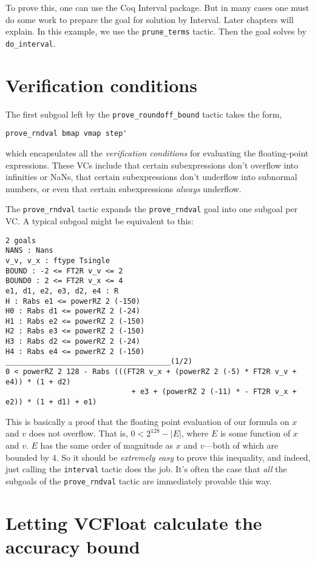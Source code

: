 \documentclass[article]{memoir}
\begin{document}
To prove this, one can use the Coq Interval package.  But in many
cases one must do some work to prepare the goal for solution by
Interval.  Later chapters will explain.
In this example, we use the \lstinline{prune_terms} tactic.
Then the goal solves by \lstinline{do_interval}.

\chapter{Verification conditions}
\label{goal1}
The first subgoal left by the \lstinline{prove_roundoff_bound} tactic
takes the form,
\begin{lstlisting}
prove_rndval bmap vmap step'
\end{lstlisting}
which encapsulates all the \emph{verification conditions} for
evaluating the floating-point expressions.  These VCs include that
certain subexpressions don't overflow into infinities or NaNs,
that certain subexpressions don't underflow into subnormal numbers,
or even that certain subexpressions \emph{always} underflow.

The \lstinline{prove_rndval} tactic expands
the \lstinline{prove_rndval} goal into one subgoal per VC.
A typical subgoal might be equivalent to this:

\begin{lstlisting}
2 goals
NANS : Nans
v_v, v_x : ftype Tsingle
BOUND : -2 <= FT2R v_v <= 2
BOUND0 : 2 <= FT2R v_x <= 4
e1, d1, e2, e3, d2, e4 : R
H : Rabs e1 <= powerRZ 2 (-150)
H0 : Rabs d1 <= powerRZ 2 (-24)
H1 : Rabs e2 <= powerRZ 2 (-150)
H2 : Rabs e3 <= powerRZ 2 (-150)
H3 : Rabs d2 <= powerRZ 2 (-24)
H4 : Rabs e4 <= powerRZ 2 (-150)
______________________________________(1/2)
0 < powerRZ 2 128 - Rabs (((FT2R v_x + (powerRZ 2 (-5) * FT2R v_v + e4)) * (1 + d2)
                             + e3 + (powerRZ 2 (-11) * - FT2R v_x + e2)) * (1 + d1) + e1)
\end{lstlisting}

This is basically a proof that the floating point evaluation
of our formula on $x$ and $v$ does not
overflow.  That is, $0 < 2^{128}-|E|$, where
$E$ is some function of $x$ and $v$.
$E$ has the same order of magnitude as $x$ and $v$---both of which are bounded
by 4.   So it should be \emph{extremely easy} to prove this
inequality, and indeed, just calling the \lstinline{interval}
tactic does the job.  It's often the case that \emph{all} the
subgoals of the \lstinline{prove_rndval} tactic are
immediately provable this way.

\chapter{Letting VCFloat calculate the accuracy bound}
\label{calculate-bound}
\end{document}
